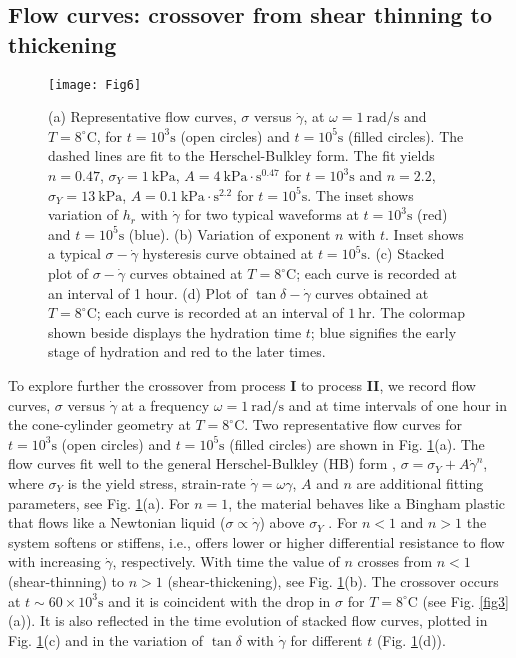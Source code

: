 \documentclass[final,5p,twocolumn]{elsarticle}
\begin{document}
{\subsection*{Flow curves: crossover from shear thinning to thickening}
\begin{figure}[t]
		\centering
		\texttt{[image: Fig6]}
		\caption{(a) Representative flow curves, $\sigma$  versus $\dot\gamma$, at $\omega=1~\mbox{rad/s}$ and $T=8^{\circ}\mbox{C}$, for $t=10^3\mbox{s}$ (open circles) and  $t=10^5\mbox{s}$ (filled circles). The dashed lines are fit to the Herschel-Bulkley form. The fit yields $n=0.47$, $\sigma_Y =1~\mbox{kPa}$, $A=4~\mbox{kPa}\cdot \mbox{s}^{0.47}$ for $t=10^3\mbox{s}$ and $n =2.2$, $\sigma_Y=13~\mbox{kPa}$,  $A=0.1~\mbox{kPa}\cdot \mbox{s}^{2.2}$ for $t=10^5\mbox{s}$. The inset shows variation of $h_r$ with $\dot\gamma$ for two typical waveforms  at $t= 10^3\mbox{s}$ (red) and $t=10^5\mbox{s}$ (blue). (b) Variation of exponent $n$ with  $t$.  Inset shows a typical $\sigma-\dot\gamma$ hysteresis curve obtained at  $t=10^5\mbox{s}$.  (c) Stacked plot of $\sigma-\dot\gamma$ curves obtained at $T=8^{\circ}\mbox{C}$; each curve is recorded at an interval of 1 hour. (d) Plot of $\tan\delta-\dot\gamma$ curves obtained at $T=8^{\circ}\mbox{C}$; each curve is recorded at an interval of $1~\mbox{hr}$. The colormap shown beside displays the hydration time $t$;  blue signifies the early stage of hydration and red to the later times.}
		\label{fig5}
	\end{figure}
	To explore further the crossover from  process \textbf{I} to  process \textbf{II}, we record flow curves, $\sigma$ versus $\dot\gamma$ at a frequency  $\omega=1~\mbox{rad/s}$  and at time intervals of one hour in the cone-cylinder geometry at $T=8 ^{\circ}\mbox{C}$.  Two representative flow curves for $t=10^3\mbox{s}$ (open circles) and $t=10^5\mbox{s}$ (filled circles)  are shown in Fig. \ref{fig5}(a).  The flow curves  fit well to the  general Herschel-Bulkley (HB) form \cite{roussel_understanding_2012,larrard_fresh_1998}, $\sigma=\sigma_Y+A{\dot{\gamma}}^n$, where $\sigma_Y$ is the yield stress, strain-rate $\dot{\gamma}=\omega\gamma$, $A$ and $n$ are additional fitting parameters, see Fig. \ref{fig5}(a). For $n=1$, the material behaves like a Bingham plastic that flows like a Newtonian liquid ($\sigma\propto\dot{\gamma}$) above $\sigma_Y$ \cite{otsubo_1980}. For $n<1$ and $n>1$ the system softens or stiffens, i.e., offers lower or higher differential resistance to flow with increasing $\dot{\gamma}$, respectively.  With time the value of $n$ crosses from $n<1$ (shear-thinning) to $n>1$ (shear-thickening), see Fig. \ref{fig5}(b).  The crossover occurs at $t\sim 60\times10^3\mbox{s}$ and it is coincident with the drop in $\sigma$ for $T=8^{\circ}\mbox{C}$ (see Fig. \ref{fig3}(a)). It is also reflected in the time evolution of  stacked flow curves, plotted in Fig. \ref{fig5}(c) and in the variation of $\tan\delta$ with $\dot\gamma$ for different $t$ (Fig. \ref{fig5}(d)). 
	


}
\end{document}
